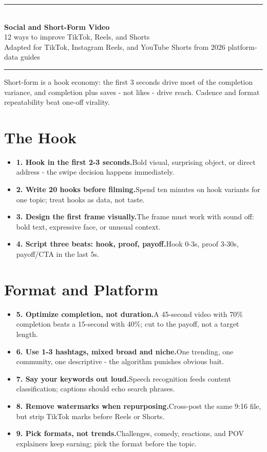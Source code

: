 \documentclass[11pt]{article}
\newcommand{\tip}[2]{\item \textbf{#1.}\enspace #2}
\newcommand{\tlabel}{\textcolor{accent}{\small$\blacktriangleright$}}
\newcommand{\footertitle}{Content Creation Playbook}
\newcommand{\docbanner}[3]{%
  \begin{center}
    {\color{accent}\rule{\textwidth}{1.4pt}}\\[10pt]
    {\Huge\bfseries\color{black} #1}\\[8pt]
    {\large\color{softgray} #2}\\[8pt]
    {\small\color{softgray} #3}\\[6pt]
    {\color{accent}\rule{\textwidth}{1.4pt}}
  \end{center}
  \vspace{6pt}
}
\begin{document}
\renewcommand{\footertitle}{Social and Short-Form Video}
\docbanner{Social and Short-Form Video}{12 ways to improve TikTok, Reels, and Shorts}{Adapted for TikTok, Instagram Reels, and YouTube Shorts from 2026 platform-data guides}
\begin{tcolorbox}[colback=accent!5,colframe=accent,boxrule=0.8pt,arc=2pt,left=8pt,right=8pt,top=6pt,bottom=6pt]
\small Short-form is a hook economy: the first 3 seconds drive most of the completion variance, and completion plus saves - not likes - drive reach. Cadence and format repeatability beat one-off virality.
\end{tcolorbox}
\vspace{6pt}
\section*{The Hook}
\begin{itemize}[label=\tlabel]
\tip{1. Hook in the first 2-3 seconds}{Bold visual, surprising object, or direct address - the swipe decision happens immediately.}
\tip{2. Write 20 hooks before filming}{Spend ten minutes on hook variants for one topic; treat hooks as data, not taste.}
\tip{3. Design the first frame visually}{The frame must work with sound off: bold text, expressive face, or unusual context.}
\tip{4. Script three beats: hook, proof, payoff}{Hook 0-3s, proof 3-30s, payoff/CTA in the last 5s.}
\end{itemize}
\section*{Format and Platform}
\begin{itemize}[label=\tlabel]
\tip{5. Optimize completion, not duration}{A 45-second video with 70\% completion beats a 15-second with 40\%; cut to the payoff, not a target length.}
\tip{6. Use 1-3 hashtags, mixed broad and niche}{One trending, one community, one descriptive - the algorithm punishes obvious bait.}
\tip{7. Say your keywords out loud}{Speech recognition feeds content classification; captions should echo search phrases.}
\tip{8. Remove watermarks when repurposing}{Cross-post the same 9:16 file, but strip TikTok marks before Reels or Shorts.}
\tip{9. Pick formats, not trends}{Challenges, comedy, reactions, and POV explainers keep earning; pick the format before the topic.}
\end{itemize}
\end{document}
